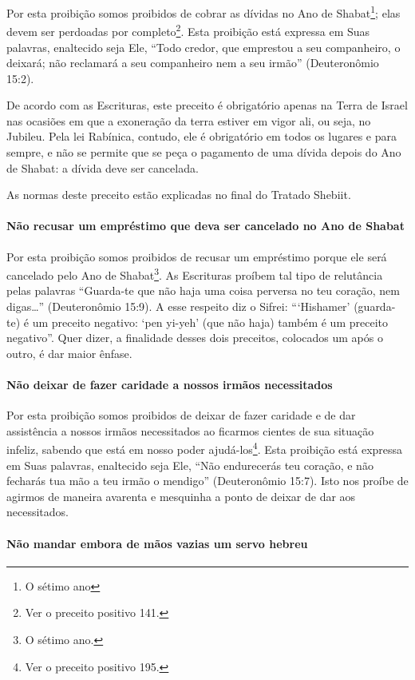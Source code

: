 Por esta proibição somos proibidos de cobrar as dívidas no Ano de
Shabat\footnote{O sétimo ano}; elas devem ser perdoadas por
completo\footnote{Ver o preceito positivo 141.}. Esta proibição está expressa em Suas
palavras, enaltecido seja Ele, ``Todo credor, que emprestou a seu
companheiro, o deixará; não reclamará a seu companheiro nem a seu
irmão'' (Deuteronômio 15:2).

De acordo com as Escrituras, este preceito é obrigatório apenas na Terra
de Israel nas ocasiões em que a exoneração da terra estiver em vigor
ali, ou seja, no Jubileu. Pela lei Rabínica, contudo, ele é obrigatório
em todos os lugares e para sempre, e não se permite que se peça o
pagamento de uma dívida depois do Ano de Shabat: a dívida deve ser
cancelada.

As normas deste preceito estão explicadas no final do Tratado Shebiit.

\paragraph{Não recusar um empréstimo que deva ser cancelado no Ano de Shabat}

Por esta proibição somos proibidos de recusar um empréstimo porque ele
será cancelado pelo Ano de Shabat\footnote{O sétimo ano.}. As Escrituras
proíbem tal tipo de relutância pelas palavras ``Guarda-te que não haja
uma coisa perversa no teu coração, nem digas\ldots{}'' (Deuteronômio 15:9). A
esse respeito diz o Sifrei: ```Hishamer' (guarda-te) é um preceito
negativo: `pen yi-yeh' (que não haja) também é um preceito negativo''.
Quer dizer, a finalidade desses dois preceitos, colocados um após o
outro, é dar maior ênfase.

\paragraph{Não deixar de fazer caridade a nossos irmãos necessitados}

Por esta proibição somos proibidos de deixar de fazer caridade e de dar
assistência a nossos irmãos necessitados ao ficarmos cientes de sua
situação infeliz, sabendo que está em nosso poder
ajudá-los\footnote{Ver o preceito positivo 195.}. Esta proibição está expressa em Suas
palavras, enaltecido seja Ele, ``Não endurecerás teu coração, e não
fecharás tua mão a teu irmão o mendigo'' (Deuteronômio 15:7). Isto nos
proíbe de agirmos de maneira avarenta e mesquinha a ponto de deixar de
dar aos necessitados.

\paragraph{Não mandar embora de mãos vazias um servo hebreu}

